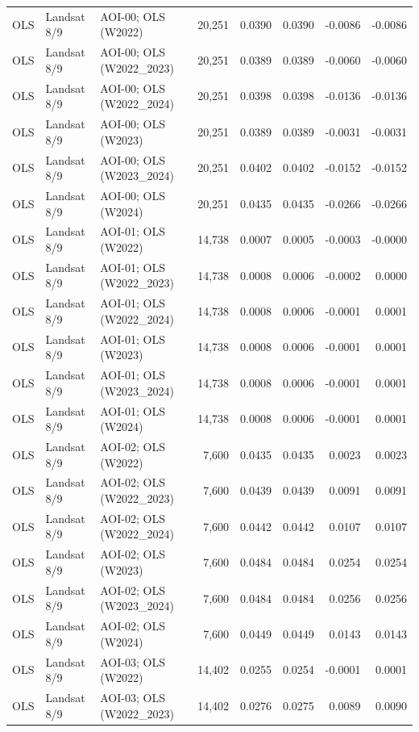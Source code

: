 \begin{landscape}
\begin{longtable}{lllrrrrr}
OLS & Landsat 8/9 & AOI-00; OLS (W2022) & 20,251 & 0.0390 & 0.0390 & -0.0086 & -0.0086 \\
OLS & Landsat 8/9 & AOI-00; OLS (W2022\_2023) & 20,251 & 0.0389 & 0.0389 & -0.0060 & -0.0060 \\
OLS & Landsat 8/9 & AOI-00; OLS (W2022\_2024) & 20,251 & 0.0398 & 0.0398 & -0.0136 & -0.0136 \\
OLS & Landsat 8/9 & AOI-00; OLS (W2023) & 20,251 & 0.0389 & 0.0389 & -0.0031 & -0.0031 \\
OLS & Landsat 8/9 & AOI-00; OLS (W2023\_2024) & 20,251 & 0.0402 & 0.0402 & -0.0152 & -0.0152 \\
OLS & Landsat 8/9 & AOI-00; OLS (W2024) & 20,251 & 0.0435 & 0.0435 & -0.0266 & -0.0266 \\
OLS & Landsat 8/9 & AOI-01; OLS (W2022) & 14,738 & 0.0007 & 0.0005 & -0.0003 & -0.0000 \\
OLS & Landsat 8/9 & AOI-01; OLS (W2022\_2023) & 14,738 & 0.0008 & 0.0006 & -0.0002 & 0.0000 \\
OLS & Landsat 8/9 & AOI-01; OLS (W2022\_2024) & 14,738 & 0.0008 & 0.0006 & -0.0001 & 0.0001 \\
OLS & Landsat 8/9 & AOI-01; OLS (W2023) & 14,738 & 0.0008 & 0.0006 & -0.0001 & 0.0001 \\
OLS & Landsat 8/9 & AOI-01; OLS (W2023\_2024) & 14,738 & 0.0008 & 0.0006 & -0.0001 & 0.0001 \\
OLS & Landsat 8/9 & AOI-01; OLS (W2024) & 14,738 & 0.0008 & 0.0006 & -0.0001 & 0.0001 \\
OLS & Landsat 8/9 & AOI-02; OLS (W2022) & 7,600 & 0.0435 & 0.0435 & 0.0023 & 0.0023 \\
OLS & Landsat 8/9 & AOI-02; OLS (W2022\_2023) & 7,600 & 0.0439 & 0.0439 & 0.0091 & 0.0091 \\
OLS & Landsat 8/9 & AOI-02; OLS (W2022\_2024) & 7,600 & 0.0442 & 0.0442 & 0.0107 & 0.0107 \\
OLS & Landsat 8/9 & AOI-02; OLS (W2023) & 7,600 & 0.0484 & 0.0484 & 0.0254 & 0.0254 \\
OLS & Landsat 8/9 & AOI-02; OLS (W2023\_2024) & 7,600 & 0.0484 & 0.0484 & 0.0256 & 0.0256 \\
OLS & Landsat 8/9 & AOI-02; OLS (W2024) & 7,600 & 0.0449 & 0.0449 & 0.0143 & 0.0143 \\
OLS & Landsat 8/9 & AOI-03; OLS (W2022) & 14,402 & 0.0255 & 0.0254 & -0.0001 & 0.0001 \\
OLS & Landsat 8/9 & AOI-03; OLS (W2022\_2023) & 14,402 & 0.0276 & 0.0275 & 0.0089 & 0.0090 \\

\end{longtable}
\end{landscape}
